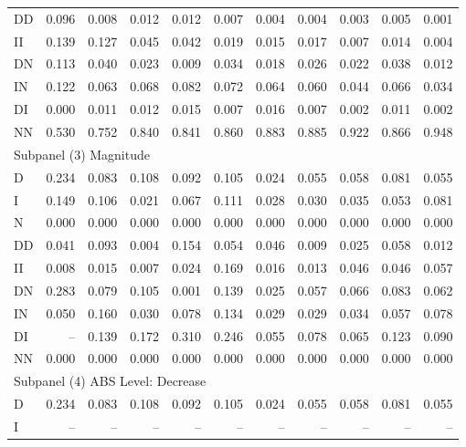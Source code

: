 {\begin{tabular}{lrrrrrrrrrr}
DD     & 0.096 & 0.008 & 0.012 & 0.012 &  0.007 &  0.004 &  0.004 &  0.003 &  0.005 &  0.001 \\
II     & 0.139 & 0.127 & 0.045 & 0.042 &  0.019 &  0.015 &  0.017 &  0.007 &  0.014 &  0.004 \\
DN     & 0.113 & 0.040 & 0.023 & 0.009 &  0.034 &  0.018 &  0.026 &  0.022 &  0.038 &  0.012 \\
IN     & 0.122 & 0.063 & 0.068 & 0.082 &  0.072 &  0.064 &  0.060 &  0.044 &  0.066 &  0.034 \\
DI     & 0.000 & 0.011 & 0.012 & 0.015 &  0.007 &  0.016 &  0.007 &  0.002 &  0.011 &  0.002 \\
NN     & 0.530 & 0.752 & 0.840 & 0.841 &  0.860 &  0.883 &  0.885 &  0.922 &  0.866 &  0.948 \\ \hline
\multicolumn{11}{l}{Subpanel (3) Magnitude}                                                  \\ \hline
D      & 0.234 & 0.083 & 0.108 & 0.092 &  0.105 &  0.024 &  0.055 &  0.058 &  0.081 &  0.055 \\
I      & 0.149 & 0.106 & 0.021 & 0.067 &  0.111 &  0.028 &  0.030 &  0.035 &  0.053 &  0.081 \\
N      & 0.000 & 0.000 & 0.000 & 0.000 &  0.000 &  0.000 &  0.000 &  0.000 &  0.000 &  0.000 \\
DD     & 0.041 & 0.093 & 0.004 & 0.154 &  0.054 &  0.046 &  0.009 &  0.025 &  0.058 &  0.012 \\
II     & 0.008 & 0.015 & 0.007 & 0.024 &  0.169 &  0.016 &  0.013 &  0.046 &  0.046 &  0.057 \\
DN     & 0.283 & 0.079 & 0.105 & 0.001 &  0.139 &  0.025 &  0.057 &  0.066 &  0.083 &  0.062 \\
IN     & 0.050 & 0.160 & 0.030 & 0.078 &  0.134 &  0.029 &  0.029 &  0.034 &  0.057 &  0.078 \\
DI     &    -- & 0.139 & 0.172 & 0.310 &  0.246 &  0.055 &  0.078 &  0.065 &  0.123 &  0.090 \\
NN     & 0.000 & 0.000 & 0.000 & 0.000 &  0.000 &  0.000 &  0.000 &  0.000 &  0.000 &  0.000 \\ \hline
\multicolumn{11}{l}{Subpanel (4) ABS Level: Decrease}                                        \\ \hline
D      & 0.234 & 0.083 & 0.108 & 0.092 &  0.105 &  0.024 &  0.055 &  0.058 &  0.081 &  0.055 \\
I      &    -- &    -- &    -- &    -- &     -- &     -- &     -- &     -- &     -- &     -- \\

\end{tabular}}
